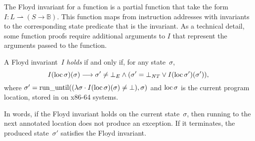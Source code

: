 The Floyd invariant for a function is a partial function
that take the form $I:L\rightharpoonup(S\rightarrow\mathbb{B})$.%
%
This function maps from instruction addresses with invariants
to the corresponding state predicate that is the invariant.
As a technical detail, some function proofs require additional arguments to $I$
that represent the arguments passed to the function.
\begin{definition}\label{def:floyd_inv}
  A Floyd invariant~$I$ \emph{holds} if and only if, for any state~$\sigma$,
  \begin{equation}
    I(\operatorname{loc}\sigma)(\sigma)\longrightarrow
    \sigma'\neq\bot_E\wedge(\sigma'=\bot_{\mathit{NT}}\vee I(\operatorname{loc}\sigma')(\sigma')),
  \end{equation}
  where
  $\sigma'=\operatorname{run\_until}((\lambda\sigma\cdot I(\operatorname{loc}\sigma)(\sigma)\neq\bot),\sigma)$%
  and $\operatorname{loc}\sigma$ is the current program location,
  stored in  on x86-64 systems.
\end{definition}
In words, if the Floyd invariant holds on the current state~$\sigma$,
then running to the next annotated location does not produce an exception.
If it terminates, the produced state~$\sigma'$ satisfies the Floyd invariant.

